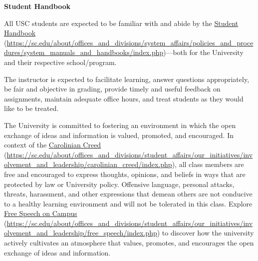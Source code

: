 \documentclass[11pt,letterpaper]{article}
\begin{document}
{\bfseries Student Handbook} \par
All USC students are expected to be familiar with and abide by the \href{https://sc.edu/about/offices_and_divisions/system_affairs/policies_and_procedures/system_manuals_and_handbooks/index.php}{Student Handbook} (\url{https://sc.edu/about/offices_and_divisions/system_affairs/policies_and_procedures/system_manuals_and_handbooks/index.php})---both for the University and their respective school/program. \sectionbreak




The instructor is expected to facilitate learning, answer questions appropriately, be fair and objective in grading, provide timely and useful feedback on assignments, maintain adequate office hours, and treat students as they would like to be treated. \sectionbreak




The University is committed to fostering an environment in which the open exchange of ideas and information is valued, promoted, and encouraged.  In context of the \href{https://sc.edu/about/offices\_and\_divisions/student\_affairs/our\_initiatives/involvement\_and\_leadership/carolinian\_creed/index.php}{Carolinian Creed} (\url{https://sc.edu/about/offices\_and\_divisions/student\_affairs/our\_initiatives/involvement\_and\_leadership/carolinian\_creed/index.php}), all class members are free and encouraged to express thoughts, opinions, and beliefs in ways that are protected by law or University policy. Offensive language, personal attacks, threats, harassment, and other expressions that demean others are not conducive to a healthy learning environment and will not be tolerated in this class. Explore \href{https://sc.edu/about/offices\_and\_divisions/student\_affairs/our\_initiatives/involvement\_and\_leadership/free\_speech/index.php}{Free Speech on Campus} (\url{https://sc.edu/about/offices\_and\_divisions/student\_affairs/our\_initiatives/involvement\_and\_leadership/free\_speech/index.php}) to discover how the university actively cultivates an atmosphere that values, promotes, and encourages the open exchange of ideas and information. \sectionbreak



\end{document}
